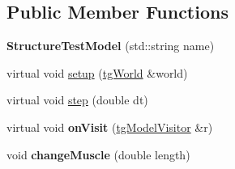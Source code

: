 \subsection*{Public Member Functions}
\begin{DoxyCompactItemize}
\item 
\hypertarget{class_structure_test_model_a95bef98e18c1e53df65241b109a53425}{{\bfseries Structure\-Test\-Model} (std\-::string name)}\label{class_structure_test_model_a95bef98e18c1e53df65241b109a53425}

\item 
virtual void \hyperlink{class_structure_test_model_a74f877900f9416a6182ce51f2783463e}{setup} (\hyperlink{classtg_world}{tg\-World} \&world)
\item 
virtual void \hyperlink{class_structure_test_model_a5496e69ff5d9c7bf1ecf84686900ea37}{step} (double dt)
\item 
\hypertarget{class_structure_test_model_a1222fc27081c99496f603692e5d87e8a}{virtual void {\bfseries on\-Visit} (\hyperlink{classtg_model_visitor}{tg\-Model\-Visitor} \&r)}\label{class_structure_test_model_a1222fc27081c99496f603692e5d87e8a}

\item 
\hypertarget{class_structure_test_model_a484f26955ccbfd8fed36b93eb0b21bc6}{void {\bfseries change\-Muscle} (double length)}\label{class_structure_test_model_a484f26955ccbfd8fed36b93eb0b21bc6}


\end{DoxyCompactItemize}
